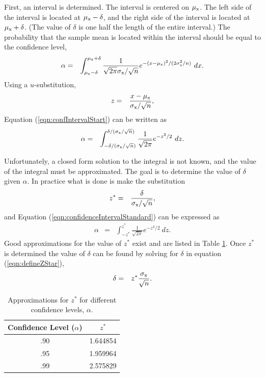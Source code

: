 \documentclass[12pt]{article}
\begin{document}
First, an interval is determined. The interval is centered on
$\mu_{\rm x}$.  The left side of the interval is located at $\mu_{\rm
  x}-\delta$, and the right side of the interval is located at
$\mu_{\rm x}+\delta$. (The value of $\delta$ is one half the length of
the entire interval.) The probability that the sample mean is located
within the interval should be equal to the confidence level,
\begin{eqnarray}
  \label{eqn:confIntervalStart}
  \alpha & = & \int^{\mu_{\rm x}+\delta}_{\mu_{\rm x}-\delta}
  \frac{1}{\sqrt{2\pi}\sigma_{\rm x}/\sqrt{n}} 
  e^{-(x-\mu_{\rm x})^2/(2\sigma_{\rm x}^2/n)}~dx.
\end{eqnarray}
Using a $u$-substitution,
\begin{eqnarray*}
  z & = & \frac{x-\mu_{\rm x}}{\sigma_{\rm x}/\sqrt{n}},
\end{eqnarray*}
Equation (\ref{eqn:confIntervalStart}) can be written as
\begin{eqnarray}
  \label{eqn:confidenceIntervalStandard}
  \alpha & = &
  \int^{\delta/(\sigma_{\rm x}/\sqrt{n})}_{-\delta/(\sigma_{\rm x}/\sqrt{n})} 
  \frac{1}{\sqrt{2\pi}} e^{-z^2/2}~dz.
\end{eqnarray}

Unfortunately, a closed form solution to the integral is not known,
and the value of the integral must be approximated. The goal is to
determine the value of $\delta$ given $\alpha$. In practice what is
done is make the substitution
\begin{eqnarray}
  \label{eqn:defineZStar}
  z^* & = & \frac{\delta}{\sigma_{\rm x}/\sqrt{n}},
\end{eqnarray}
and Equation (\ref{eqn:confidenceIntervalStandard}) can be expressed
as
\begin{eqnarray*}
  \alpha & = &
  \int^{z^*}_{-z^*} \frac{1}{\sqrt{2\pi}} e^{-z^2/2}~dz.  
\end{eqnarray*}
Good approximations for the value of $z^*$ exist and are listed in
Table \ref{tab:confidenceZVals}. Once $z^*$ is determined the value of
$\delta$ can be found by solving for $\delta$ in equation
(\ref{eqn:defineZStar}),
\begin{eqnarray}
  \label{eqn:widthCI}
  \delta & = & z^* \frac{\sigma_{\rm x}}{\sqrt{n}}.
\end{eqnarray}

\begin{table}[ht]
  \begin{center}
    \begin{tabular}{cc}
      Confidence Level ($\alpha$) & $z^*$ \\ \hline 
      .90 & 1.644854 \\
      .95 & 1.959964 \\
      .99 & 2.575829
    \end{tabular}    
  \end{center}
  \caption{Approximations for $z^*$ for different confidence levels, $\alpha$.}
  \label{tab:confidenceZVals}
\end{table}
\end{document}
